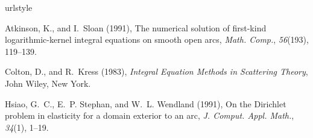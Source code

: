 \documentclass[draft,jgrga]{AGUTeX}
\begin{document}
\begin{article}










\begin{thebibliography}{}

\providecommand{\natexlab}[1]{#1}
\expandafter\ifx\csname urlstyle\endcsname\relax
  \providecommand{\doi}[1]{doi:\discretionary{}{}{}#1}\else
  \providecommand{\doi}{doi:\discretionary{}{}{}\begingroup
  \urlstyle{rm}\Url}\fi

Atkinson, K., and I.~Sloan (1991), The numerical solution of first-kind
  logarithmic-kernel integral equations on smooth open arcs, \textit{Math.
  Comp.}, \textit{56}(193), 119--139.

Colton, D., and R.~Kress (1983), \textit{Integral Equation Methods in
  Scattering Theory}, John Wiley, New York.

Hsiao, G.~C., E.~P. Stephan, and W.~L. Wendland (1991), On the {D}irichlet
  problem in elasticity for a domain exterior to an arc, \textit{J. Comput.
  Appl. Math.}, \textit{34}(1), 1--19.


\end{thebibliography}
\end{article}
\end{document}
